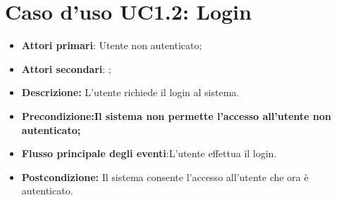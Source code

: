 \section{Caso d'uso UC1.2: Login}
\begin{itemize}
	\item \textbf{Attori primari}: Utente non autenticato;
	\item \textbf{Attori secondari}: ;
	\item \textbf{Descrizione:} L'utente richiede il login al sistema.
	\item \textbf{Precondizione:Il sistema non permette l'accesso all'utente non autenticato;}
	\item \textbf{Flusso principale degli eventi}:L'utente effettua il login.
	\item \textbf{Postcondizione:} Il sistema consente l'accesso all'utente che ora è autenticato.
\end{itemize}